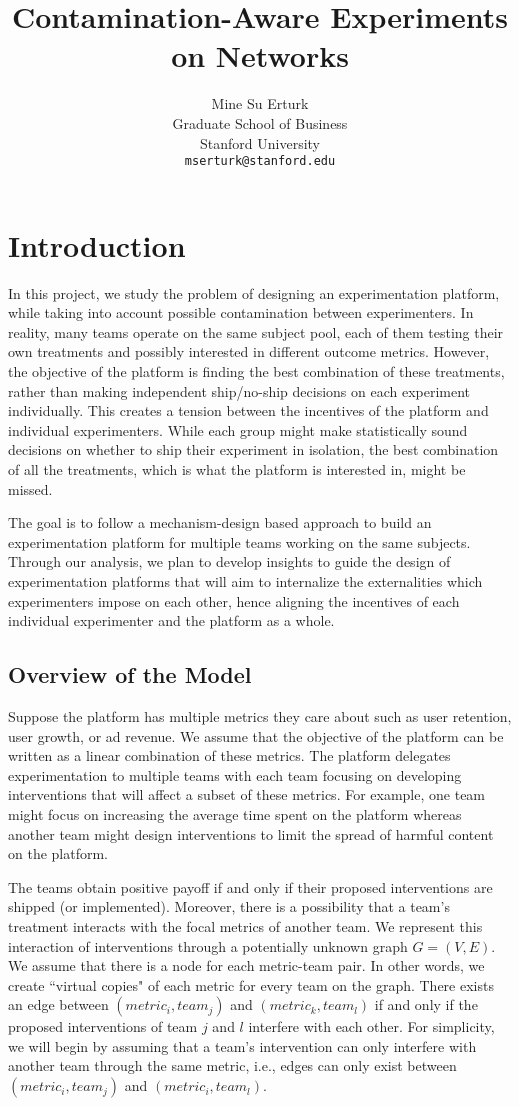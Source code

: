\documentclass[11pt,a4paper]{article}
\title{ Contamination-Aware Experiments on Networks }
\author{
Mine Su Erturk\\
Graduate School of Business\\
Stanford University\\
   \texttt{mserturk@stanford.edu} 
\iffalse  
  \and
Eray Turkel\\
Graduate School of Business\\
Stanford University\\
   \texttt{eturkel@stanford.edu} 
   \fi
}
\date{}
\begin{document}
\maketitle

\section{Introduction}
In this project, we study the problem of designing an experimentation platform, while taking into account possible contamination between experimenters. In reality, many teams operate on the same subject pool, each of them testing their own treatments and possibly interested in different outcome metrics. However, the objective of the platform is finding the best combination of these treatments, rather than making independent ship/no-ship decisions on each experiment individually. This creates a tension between the incentives of the platform and individual experimenters. While each group might make statistically sound decisions on whether to ship their experiment in isolation, the best combination of all the treatments, which is what the platform is interested in, might be missed.

The goal is to follow a mechanism-design based approach to build an experimentation platform for multiple teams working on the same subjects. Through our analysis, we plan to develop insights to guide the design of experimentation platforms that will aim to internalize the externalities which experimenters impose on each other, hence aligning the incentives of each individual experimenter and the platform as a whole.

\subsection{Overview of the Model}

Suppose the platform has multiple metrics they care about such as user retention, user growth, or ad revenue. We assume that the objective of the platform can be written as a linear combination of these metrics. The platform delegates experimentation to multiple teams with each team focusing on developing interventions that will affect a subset of these metrics. For example, one team might focus on increasing the average time spent on the platform whereas another team might design interventions to limit the spread of harmful content on the platform. 

The teams obtain positive payoff if and only if their proposed interventions are shipped (or implemented). Moreover, there is a possibility that a team's treatment interacts with the focal metrics of another team. We represent this interaction of interventions through a potentially unknown graph $G=(V,E)$. We assume that there is a node for each metric-team pair. In other words, we create ``virtual copies" of each metric for every team on the graph. There exists an edge between $(metric_i, team_j)$ and $(metric_k, team_l)$ if and only if the proposed interventions of team $j$ and $l$ interfere with each other. For simplicity, we will begin by assuming that a team's intervention can only interfere with another team through the same metric, i.e., edges can only exist between $(metric_i, team_j)$ and $(metric_i, team_l)$. 
\end{document}
